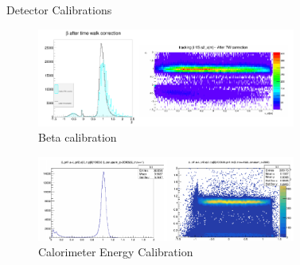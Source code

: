 \documentclass{beamer}
\begin{document}
\begin{frame}

\begin{block}{Detector Calibrations}
\begin{figure}
	\caption{Beta calibration}
	\includegraphics[width=8.5cm]{../images/beta_cal}
\end{figure}
\vspace{-15pt}
\begin{figure}
	\caption{Calorimeter Energy Calibration}
	\includegraphics[width=8.5cm]{../images/e_cal}
\end{figure}

\end{block}	
\end{frame}
\end{document}
